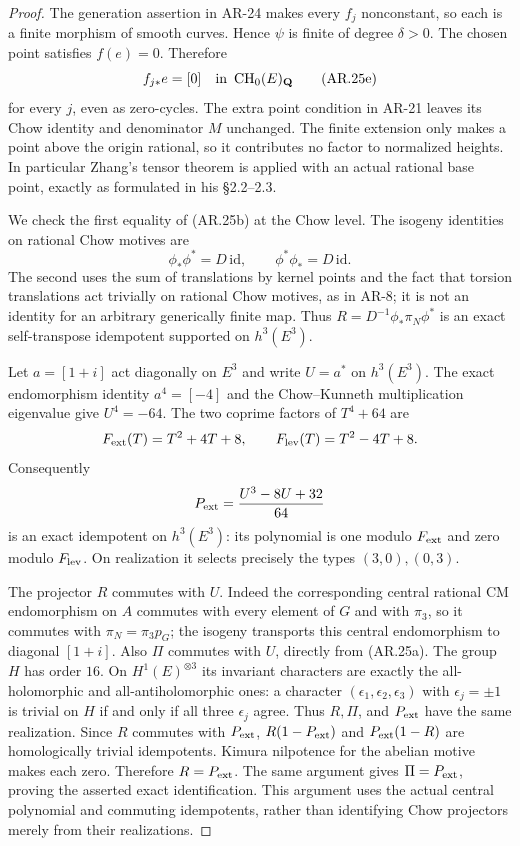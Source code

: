 \documentclass[11pt,a4paper]{article}
\begin{document}
\begin{proof}
The generation assertion in AR-24 makes every $f_j$ nonconstant,
so each is a finite morphism of smooth curves.  Hence $\psi$ is
finite of degree $\delta>0$.  The chosen point satisfies $f(e)=0$.
Therefore
\[
 f_{j*}e=[0]\quad\hbox{in }\operatorname{CH}_0(E)_\mathbf Q
                                                               \tag{AR.25e}
\]
for every $j$, even as zero-cycles.  The extra point condition in
AR-21 leaves its Chow identity and denominator $M$ unchanged.
The finite extension only makes a point above the origin rational,
so it contributes no factor to normalized heights.  In particular
Zhang's tensor theorem is applied with an actual rational base
point, exactly as formulated in his \S2.2--2.3.

We check the first equality of (AR.25b) at the Chow level.  The
isogeny identities on rational Chow motives are
\[
 \phi_*\phi^*=D\,\mathrm{id},\qquad
 \phi^*\phi_*=D\,\mathrm{id}.                           \tag{AR.25f}
\]
The second uses the sum of translations by kernel points and the
fact that torsion translations act trivially on rational Chow
motives, as in AR-8; it is not an identity for an arbitrary
generically finite map.  Thus
$R=D^{-1}\phi_*\pi_N\phi^*$ is an exact self-transpose idempotent
supported on $h^3(E^3)$.

Let $a=[1+i]$ act diagonally on $E^3$ and write $U=a^*$ on
$h^3(E^3)$.  The exact endomorphism identity $a^4=[-4]$ and the
Chow--Kunneth multiplication eigenvalue give
$U^4=-64$.  The two coprime factors of $T^4+64$ are
\[
 F_{\rm ext}(T)=T^2+4T+8,\qquad
 F_{\rm lev}(T)=T^2-4T+8.
\]
Consequently
\[
 P_{\rm ext}=\frac{U^3-8U+32}{64}
\]
is an exact idempotent on $h^3(E^3)$: its polynomial is one modulo
$F_{\rm ext}$ and zero modulo $F_{\rm lev}$.  On realization it
selects precisely the types $(3,0),(0,3)$.

The projector $R$ commutes with $U$.  Indeed the corresponding
central rational CM endomorphism on $A$ commutes with every element
of $G$ and with $\pi_3$, so it commutes with $\pi_N=\pi_3p_G$;
the isogeny transports this central endomorphism to diagonal
$[1+i]$.  Also $\Pi$ commutes with $U$, directly from (AR.25a).
The group $H$ has order $16$.  On $H^1(E)^{\otimes3}$ its invariant
characters are exactly the all-holomorphic and all-antiholomorphic
ones: a character $(\epsilon_1,\epsilon_2,\epsilon_3)$ with
$\epsilon_j=\pm1$ is trivial on $H$ if and only if all three
$\epsilon_j$ agree.  Thus $R,\Pi$, and $P_{\rm ext}$ have the same
realization.  Since $R$ commutes with $P_{\rm ext}$,
$R(1-P_{\rm ext})$ and $P_{\rm ext}(1-R)$ are homologically
trivial idempotents.  Kimura nilpotence for the abelian motive makes
each zero.  Therefore $R=P_{\rm ext}$.  The same argument gives
$\Pi=P_{\rm ext}$, proving the asserted exact identification.
This argument uses the actual central polynomial and commuting
idempotents, rather than identifying Chow projectors merely from
their realizations.


\end{proof}
\end{document}
